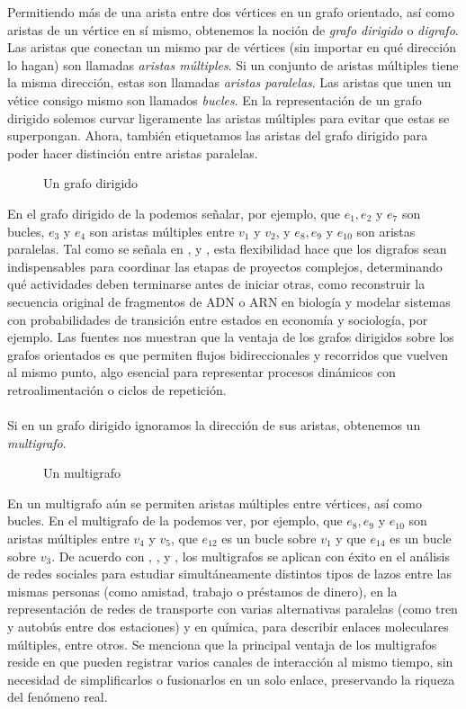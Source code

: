 Permitiendo más de una arista entre dos vértices en un grafo orientado, así como aristas de un vértice en sí mismo, obtenemos la noción de \textit{grafo dirigido} o \textit{digrafo}. Las aristas que conectan un mismo par de vértices (sin importar en qué dirección lo hagan) son llamadas \textit{aristas múltiples}. Si un conjunto de aristas múltiples tiene la misma dirección, estas son llamadas \textit{aristas paralelas}. Las aristas que unen un vétice consigo mismo son llamados \textit{bucles}. En la representación de un grafo dirigido solemos curvar ligeramente las aristas múltiples para evitar que estas se superpongan. Ahora, también etiquetamos las aristas del grafo dirigido para poder hacer distinción entre aristas paralelas.
\begin{figure}[H]
  \centering
    \resizebox{0.5\textwidth}{!}{} 
  \caption{Un grafo dirigido}
  \label{fig:digrafo}
\end{figure}
En el grafo dirigido de la  podemos señalar, por ejemplo, que $e_1, e_2$ y $e_7$ son bucles, $e_3$ y $e_4$ son aristas múltiples entre $v_1$ y $v_2$, y $e_8,e_9$ y $e_{10}$ son aristas paralelas. Tal como se señala en \cite{Foulds1991}, \cite{Gross2006} y \cite{Roberts1978}, esta flexibilidad hace que los digrafos sean indispensables para coordinar las etapas de proyectos complejos, determinando qué actividades deben terminarse antes de iniciar otras, como reconstruir la secuencia original de fragmentos de ADN o ARN en biología y modelar sistemas con probabilidades de transición entre estados en economía y sociología, por ejemplo. Las fuentes nos muestran que la ventaja de los grafos dirigidos sobre los grafos orientados es que permiten flujos bidireccionales y recorridos que vuelven al mismo punto, algo esencial para representar procesos dinámicos con retroalimentación o ciclos de repetición.\\\\
Si en un grafo dirigido ignoramos la dirección de sus aristas, obtenemos un \textit{multigrafo}.
\begin{figure}[H]
  \centering
  \resizebox{0.45\textwidth}{!}{} 
  \caption{Un multigrafo}
  \label{fig:multigrafo}
\end{figure}
En un multigrafo aún se permiten aristas múltiples entre vértices, así como bucles. En el multigrafo de la  podemos ver, por ejemplo, que $e_8,e_9$ y $e_{10}$ son aristas múltiples entre $v_4$ y $v_5$, que $e_{12}$ es un bucle sobre $v_1$ y que $e_{14}$ es un bucle sobre $v_3$. De acuerdo con \cite{Andrei2008}, \cite{Butler2023}, \cite{Gross2006} y \cite{Shafie2012}, los multigrafos se aplican con éxito en el análisis de redes sociales para estudiar simultáneamente distintos tipos de lazos entre las mismas personas (como amistad, trabajo o préstamos de dinero), en la representación de redes de transporte con varias alternativas paralelas (como tren y autobús entre dos estaciones) y en química, para describir enlaces moleculares múltiples, entre otros. Se menciona que la principal ventaja de los multigrafos reside en que pueden registrar varios canales de interacción al mismo tiempo, sin necesidad de simplificarlos o fusionarlos en un solo enlace, preservando la riqueza del fenómeno real.\clearpage
